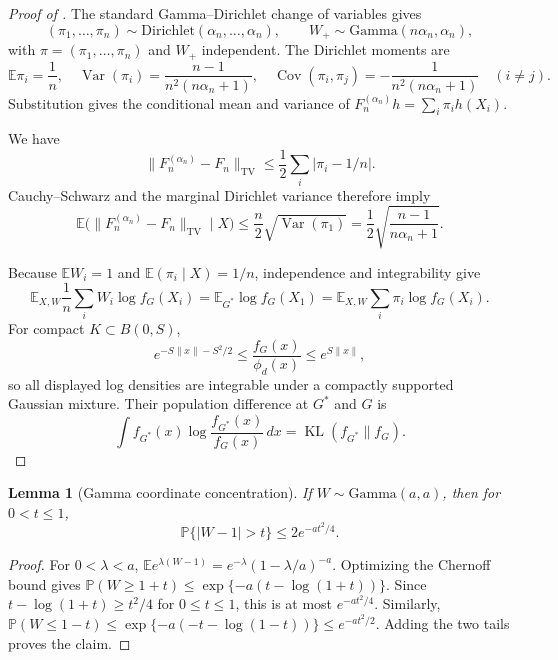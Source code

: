 \documentclass[11pt]{article}
\newtheorem{lemma}{Lemma}
\theoremstyle{definition}
\theoremstyle{remark}
\DeclareMathOperator{\KL}{KL}
\DeclareMathOperator{\TV}{TV}
\newcommand{\EE}{\mathbb E}
\newcommand{\PP}{\mathbb P}
\newcommand{\norm}[1]{\lVert #1\rVert}
\newcommand{\abs}[1]{\lvert #1\rvert}
\begin{document}
\begin{proof}[Proof of ]
The standard Gamma--Dirichlet change of
variables gives
\[
 (\pi_1,\ldots,\pi_n)\sim\mathrm{Dirichlet}(\alpha_n,\ldots,\alpha_n),
 \qquad W_+\sim\mathrm{Gamma}(n\alpha_n,\alpha_n),
\]
with $\pi=(\pi_1,\ldots,\pi_n)$ and $W_+$ independent.  The Dirichlet moments are
\[
 \EE\pi_i=\frac1n,
 \quad
 \operatorname{Var}(\pi_i)=\frac{n-1}{n^2(n\alpha_n+1)},
 \quad
 \operatorname{Cov}(\pi_i,\pi_j)=-\frac1{n^2(n\alpha_n+1)}\quad(i\ne j).
\]
Substitution gives the conditional mean and variance of
$F_n^{(\alpha_n)}h=\sum_i\pi_ih(X_i)$.

We have
\[
 \norm{F_n^{(\alpha_n)}-F_n}_{\TV}
 \le\frac12\sum_i\abs{\pi_i-1/n}.
\]
Cauchy--Schwarz and the marginal Dirichlet variance therefore imply
\[
 \EE\bigl(\norm{F_n^{(\alpha_n)}-F_n}_{\TV}\mid X\bigr)
 \le\frac n2\sqrt{\operatorname{Var}(\pi_1)}
 =\frac12\sqrt{\frac{n-1}{n\alpha_n+1}}.
\]

Because $\EE W_i=1$ and $\EE(\pi_i\mid X)=1/n$,
independence and integrability give
\[
 \EE_{X,W}\frac1n\sum_iW_i\log f_G(X_i)
 =\EE_{G^*}\log f_G(X_1)
 =\EE_{X,W}\sum_i\pi_i\log f_G(X_i).
\]
For compact $K\subset B(0,S)$,
\[
 e^{-S\norm{x}-S^2/2}
 \le\frac{f_G(x)}{\phi_d(x)}\le e^{S\norm{x}},
\]
so all displayed log densities are integrable under a compactly supported
Gaussian mixture.  Their population difference at $G^*$ and $G$ is
\[
 \int f_{G^*}(x)\log\frac{f_{G^*}(x)}{f_G(x)}\,dx
 =\KL(f_{G^*}\|f_G).
\]
\end{proof}

\begin{lemma}[Gamma coordinate concentration]
\label{lem:gamma-concentration}
If $W\sim\mathrm{Gamma}(a,a)$, then for $0<t\le1$,
\[
 \PP\{\abs{W-1}>t\}\le2e^{-at^2/4}.
\]
\end{lemma}

\begin{proof}
For $0<\lambda<a$,
$\EE e^{\lambda(W-1)}=e^{-\lambda}(1-\lambda/a)^{-a}$.  Optimizing the
Chernoff bound gives
$\PP(W\ge1+t)\le\exp\{-a(t-\log(1+t))\}$.  Since
$t-\log(1+t)\ge t^2/4$ for $0\le t\le1$, this is at most $e^{-at^2/4}$.
Similarly,
$\PP(W\le1-t)\le\exp\{-a(-t-\log(1-t))\}\le e^{-at^2/2}$.
Adding the two tails proves the claim.
\end{proof}



\end{document}
